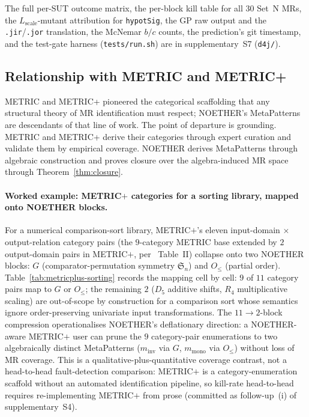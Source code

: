 \documentclass[acmsmall, screen]{acmart}
\begin{document}
The full per-SUT outcome matrix, the per-block kill table for all 30
Set~N MRs, the $L_{\mathrm{scale}}$-mutant attribution for
\texttt{hypotSig}, the GP raw output and the
\texttt{.jir}/\texttt{.jor} translation, the McNemar $b/c$ counts,
the prediction's git timestamp, and the test-gate harness
(\texttt{tests/run.sh}) are in supplementary~S7 (\texttt{d4j/}).

\subsection{Relationship with METRIC and METRIC+}
\label{subsec:metricplus-relationship}

METRIC and METRIC+ pioneered the categorical scaffolding that any structural theory of MR identification must respect; NOETHER's MetaPatterns are descendants of that line of work. The point of departure is grounding. METRIC and METRIC+ derive their categories through expert curation and validate them by empirical coverage. NOETHER derives MetaPatterns through algebraic construction and proves closure over the algebra-induced MR space through Theorem~\ref{thm:closure}.

\paragraph{Worked example: METRIC$+$ categories for a sorting library, mapped onto NOETHER blocks.}
\label{para:metricplus-sorting}
For a numerical comparison-sort library, METRIC$+$'s eleven input-domain $\times$ output-relation category pairs (the $9$-category METRIC base extended by $2$ output-domain pairs in METRIC$+$, per~\cite{SunMETRICplus2021} Table~II) collapse onto two NOETHER blocks: $G$ (comparator-permutation symmetry $\mathfrak{S}_n$) and $O_{\le}$ (partial order). Table~\ref{tab:metricplus-sorting} records the mapping cell by cell: $9$ of $11$ category pairs map to $G$ or $O_{\le}$; the remaining $2$ ($D_5$ additive shifts, $R_4$ multiplicative scaling) are out-of-scope by construction for a comparison sort whose semantics ignore order-preserving univariate input transformations. The $11 \to 2$-block compression operationalises NOETHER's deflationary direction: a NOETHER-aware METRIC$+$ user can prune the $9$ category-pair enumerations to two algebraically distinct MetaPatterns ($m_{\mathrm{inv}}$ via $G$, $m_{\mathrm{mono}}$ via $O_{\le}$) without loss of MR coverage. This is a qualitative-plus-quantitative coverage contrast, not a head-to-head fault-detection comparison: METRIC$+$ is a category-enumeration scaffold without an automated identification pipeline, so kill-rate head-to-head requires re-implementing METRIC$+$ from prose (committed as follow-up~(i) of supplementary~S4).
\end{document}
